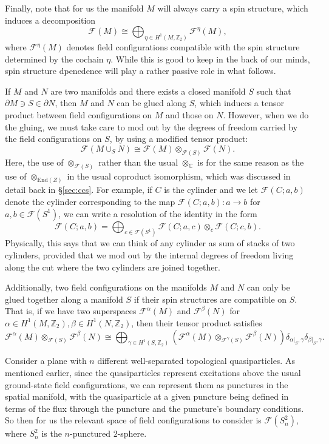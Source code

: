 \documentclass[12pt,a4paper]{article}
\newcommand{\tp}{\otimes}
\newcommand{\ra}{\rightarrow}
\newcommand{\cc}{\mathbb{C}}
\newcommand{\zt}{\mathbb{Z}_2}
\newcommand\be            {\begin{equation}}
\newcommand\ee            {\end{equation}}
\newcommand{\End}{\text{End}}
\newcommand{\p}{\partial}
\newcommand{\fld}{\mathcal{F}}
\begin{document}
Finally, note that for us the manifold $M$ will always carry a spin structure, which induces a decomposition 
\be \fld(M) \cong \bigoplus_{\eta \in H^1(M,\zt)}\fld^\eta(M),\ee
where $\fld^\eta(M)$ denotes field configurations compatible with the spin structure determined by the cochain $\eta$. While this is good to keep in the back of our minds, spin structure dpenedence will play a rather passive role in what follows. 

If $M$ and $N$ are two manifolds and there exists a closed manifold $S$ such that $\p M \ni S \in \p N$, then $M$ and $N$ can be glued along $S$, which induces a tensor product between field configurations on $M$ and those on $N$. However, when we do the gluing, we must take care to mod out by the degrees of freedom carried by the field configurations on $S$, by using a modified tensor product:
\be \label{eq:gluing} \fld(M\cup_SN) \cong \fld(M)\tp_{\fld(S)} \fld(N).\ee
Here, the use of $\tp_{\fld(S)}$ rather than the usual $\tp_\cc$ is for the same reason as the use of $\tp_{\End(Z)}$ in the usual coproduct isomorphism, which was discussed in detail back in \S \ref{sec:ccs}. For example, if $C$ is the cylinder and we let $\fld(C;a,b)$ denote the cylinder corresponding to the map $\fld(C;a,b) : a\ra b$ for $a,b\in \fld(S^1)$, we can write a resolution of the identity in the form
\be \label{eq:tuberes} \fld(C;a,b) = \bigoplus_{c\in \fld(S^1)} \fld(C;a,c) \tp_c \fld(C;c,b).\ee
Physically, this says that we can think of any cylinder as sum of stacks of two cylinders, provided that we mod out by the internal degrees of freedom living along the cut where the two cylinders are joined together. 

Additionally, two field configurations on the manifolds $M$ and $N$ can only be glued together along a manifold $S$ if their spin structures are compatible on $S$. That is, if we have two superspaces $\fld^\alpha(M)$ and $\fld^\beta(N)$ for $\alpha \in H^1(M,\zt), \beta\in H^1(N,\zt)$, then their tensor product satisfies
\be \fld^\alpha(M) \tp_{\fld(S)} \fld^\beta(N) \cong \bigoplus_{\gamma \in H^1(S,\zt)} \left( \fld^\alpha(M) \tp_{\fld^{\gamma}(S)} \fld^\beta(N) \right)  \delta_{\alpha|_S,\gamma}\delta_{\beta|_S,\gamma}.\ee

Consider a plane with $n$ different well-separated topological quasiparticles. As mentioned earlier, since the quasiparticles represent excitations above the usual ground-state field configurations, we can represent them as punctures in the spatial manifold, with the quasiparticle at a given puncture being defined in terms of the flux through the puncture and the puncture's boundary conditions. So then for us the relevant space of field configurations to consider is $\fld(S^2_n)$, where $S^2_n$ is the $n$-punctured $2$-sphere. 
\end{document}
